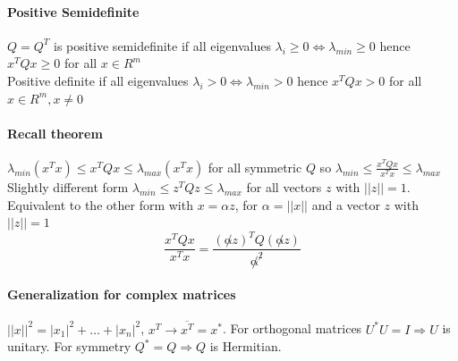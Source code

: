 \documentclass[10pt]{report}
\begin{document}
\paragraph{Positive Semidefinite} $Q = Q^T$ is positive semidefinite if all eigenvalues $\lambda_i \geq 0 \Leftrightarrow \lambda_{min} \geq 0$ hence $x^T Q x\geq 0$ for all $x\in R^m$\\
Positive definite if all eigenvalues $\lambda_i > 0 \Leftrightarrow \lambda_{min} > 0$ hence $x^TQx > 0$ for all $x \in R^m, x\neq 0$
\paragraph{Recall theorem} $\lambda_{min}(x^T x) \leq x^T Q x \leq \lambda_{max}(x^T x)$ for all symmetric $Q$ so $\lambda_{min} \leq \frac{x^T Q x}{x^T x} \leq \lambda_{max}$\\
Slightly different form $\lambda_{min} \leq z^T Q z \leq \lambda_{max}$ for all vectors $z$ with $||z|| = 1$. Equivalent to the other form with $x = \alpha z$, for $\alpha = ||x||$ and a vector $z$ with $||z|| = 1$
$$ \frac{x^T Q x}{x^T x} = \frac{(\not\alpha z)^T Q (\not\alpha z)}{\not\alpha^{\not 2}}$$
\paragraph{Generalization for complex matrices} $||x||^2 = |x_1|^2 + \ldots + |x_n|^2$, $x^T \longrightarrow \overline{x^T} = x^*$. For orthogonal matrices $U^*U=I \Rightarrow U$ is unitary. For symmetry $Q^* = Q \Rightarrow Q$ is Hermitian.
\end{document}
